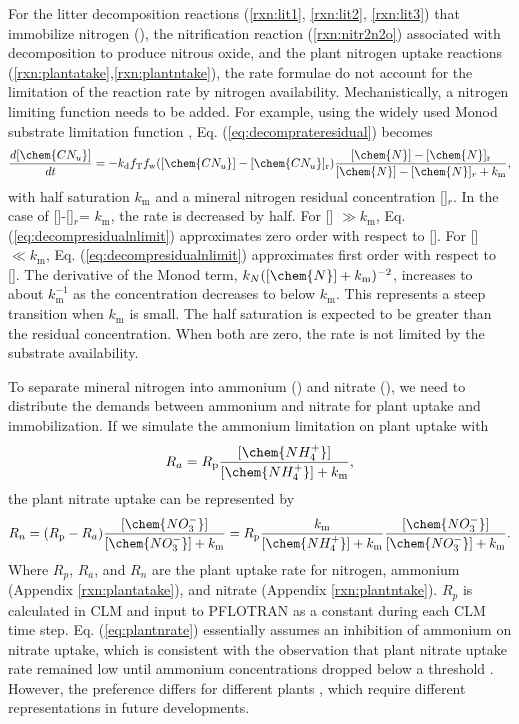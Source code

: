 \documentclass[gmd, manuscript]{copernicus}
\begin{document}
For the litter decomposition reactions (\ref{rxn:lit1}, \ref{rxn:lit2},
\ref{rxn:lit3}) that immobilize nitrogen (), the nitrification reaction
(\ref{rxn:nitr2n2o}) associated with decomposition to produce nitrous oxide,
and the plant nitrogen uptake reactions
(\ref{rxn:plantatake},\ref{rxn:plantntake}), the rate formulae do not account
for the limitation of the reaction rate by nitrogen availability.
Mechanistically, a nitrogen limiting function needs to be added. For example,
using the widely used Monod substrate limitation function \citep{Fennell1998},
Eq. (\ref{eq:decomprateresidual}) becomes 
\begin{equation}
\frac{d [\chem{CN_u}]}{d t} = -k_\text{d} f_\text{T} f_\text{w} ([\chem{CN_u}] -
[\chem{CN_u}]_\text{r}) \frac{[\chem{N}]-[\chem{N}]_\text{r}}{[\chem{N}]-[\chem{N}]_r +k_\text{m}},
\label{eq:decompresidualnlimit}
\end{equation}
with half saturation $k_\text{m}$ and a mineral nitrogen residual concentration
[]$_r$. In the case of []-[]$_r$= $k_\text{m}$, the
rate is decreased by half. For [] $\gg k_\text{m}$, Eq.
(\ref{eq:decompresidualnlimit}) approximates zero order with respect to
[]. For []$\ll k_\text{m}$, Eq. (\ref{eq:decompresidualnlimit})
approximates first order with respect to []. The derivative of the
Monod term, ${k_N}{([\chem{N}]+k_\text{m})^{-2}}$, increases to about
$k_\text{m}^{-1}$ as the concentration decreases to below $k_\text{m}$. This
represents a steep transition when $k_\text{m}$ is small. The half saturation
is expected to be greater than the residual concentration. When both are zero,
the rate is not limited by the substrate availability. 

To separate mineral nitrogen into ammonium () and nitrate
(), we need to distribute the demands between ammonium and nitrate
for plant uptake and immobilization. If we simulate the ammonium limitation on
plant uptake with 
\begin{equation}
R_a = R_\text{p} \frac{[\chem{NH_4^+}]}{[\chem{NH_4^+}]+k_\text{m}}, 
\label{eq:plantarate}
\end{equation}
the plant nitrate uptake can be represented by 
\begin{equation}
R_n = (R_\text{p} - R_a)\frac{[\chem{NO_3^-}]}{[\chem{NO_3^-}]+k_\text{m}} =
R_\text{p} \frac{k_\text{m}}{[\chem{NH_4^+}]+k_\text{m}}
\frac{[\chem{NO_3^-}]}{[\chem{NO_3^-}]+k_\text{m}}.  
\label{eq:plantnrate}
\end{equation}
Where $R_p$, $R_a$, and $R_n$ are the plant uptake rate for nitrogen, ammonium
(Appendix \ref{rxn:plantatake}), and nitrate (Appendix \ref{rxn:plantntake}).
$R_p$ is calculated in CLM and input to PFLOTRAN as a constant during each CLM
time step. Eq. (\ref{eq:plantnrate}) essentially assumes an inhibition of
ammonium on nitrate uptake, which is consistent with the observation that plant
nitrate uptake rate remained low until ammonium concentrations dropped below a
threshold \citep{eltrop1996}.  However, the preference differs for different
plants \citep{Pfautsch2009,Warren2007,Nordin2001,Falkengren1995,Gherardi2013},
which require different representations in future developments.
\end{document}
